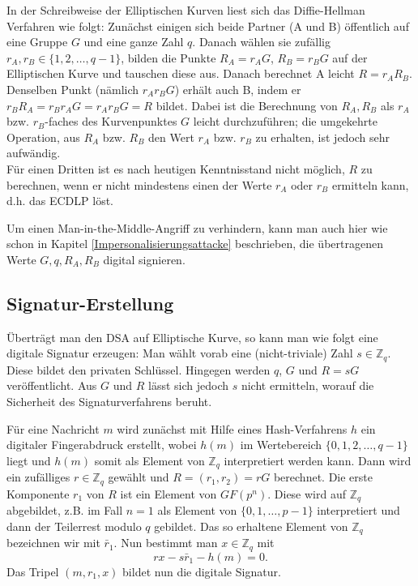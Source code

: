\begin{refsegment}
In der Schreibweise der Elliptischen Kurven liest sich das Diffie-Hellman Verfahren wie folgt: Zunächst einigen sich beide Partner (A und B) öffentlich auf eine Gruppe $G$ und eine ganze Zahl $q$. Danach wählen sie zufällig $r_A,r_B\in\{1,2,\dots,q-1\}$, bilden die Punkte $R_A=r_AG$, $R_B=r_BG$ auf der Elliptischen Kurve und tauschen diese aus. Danach berechnet A leicht $R=r_AR_B$. Denselben Punkt (nämlich $r_Ar_B G$) erhält auch B, indem er $r_BR_A=r_Br_AG=r_Ar_BG=R$ bildet. Dabei ist die Berechnung von $R_A,R_B$ als $r_A$ bzw. $r_B$-faches des Kurvenpunktes $G$ leicht durchzuführen; die umgekehrte Operation, aus $R_A$ bzw. $R_B$ den Wert $r_A$ bzw. $r_B$ zu erhalten, ist jedoch sehr aufwändig.
\\ Für einen Dritten ist es nach heutigen Kenntnisstand nicht möglich, $R$ zu berechnen, wenn er nicht mindestens einen der Werte $r_A$ oder $r_B$ ermitteln kann, d.h. das ECDLP löst.

Um einen \glqq Man-in-the-Middle\grqq-Angriff zu verhindern, kann man auch hier wie schon in Kapitel \ref{Impersonalisierungsattacke} beschrieben, die übertragenen Werte $G,q,R_A,R_B$ digital signieren.

\par
\subsection{Signatur-Erstellung}

Überträgt man den  DSA auf Elliptische Kurve, so kann man wie folgt eine digitale Signatur erzeugen: Man wählt vorab eine (nicht-triviale) Zahl $s\in{\mathbb Z}_q$. Diese bildet den privaten Schlüssel. Hingegen werden $q$, $G$ und $R=sG$ veröffentlicht. Aus $G$ und $R$ lässt sich jedoch $s$ nicht ermitteln, worauf die Sicherheit des Signaturverfahrens beruht.

Für eine Nachricht $m$ wird zunächst mit Hilfe eines Hash-Verfahrens $h$ ein digitaler Fingerabdruck erstellt, wobei $h(m)$ im Wertebereich $\{0,1,2,\dots, q-1\}$ liegt und $h(m)$ somit als Element von ${\mathbb Z}_q$ interpretiert werden kann. Dann wird ein zufälliges $r\in{\mathbb Z}_q$ gewählt und $R=(r_1,r_2)=rG$ berechnet. Die erste Komponente $r_1$ von $R$ ist ein Element von $GF(p^n)$. Diese wird auf ${\mathbb Z}_q$ abgebildet, z.B. im Fall $n=1$ als Element von $\{0,1,\dots,p-1\}$ interpretiert und dann der Teilerrest modulo $q$ gebildet. Das so erhaltene Element von ${\mathbb Z}_q$ bezeichnen wir mit $\bar r_1$. Nun bestimmt man $x\in {\mathbb Z}_q$ mit
$$ rx-s\bar r_1-h(m)=0 .
$$
Das Tripel $(m,r_1,x)$ bildet nun die digitale Signatur.


\end{refsegment}
